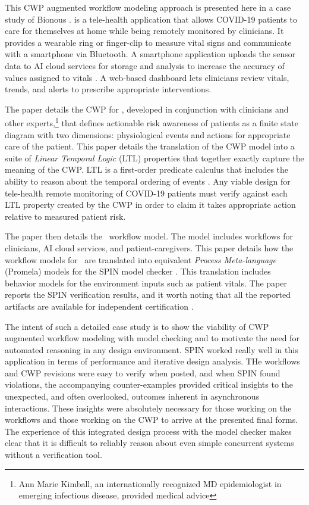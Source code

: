 This CWP augmented workflow modeling approach is presented here in a case study of Bionous \phware. \phware is a tele-health application that allows COVID-19 patients to care for themselves at home while being remotely monitored by clinicians. It provides a wearable ring or finger-clip to measure vital signs and communicate with a smartphone via Bluetooth. A smartphone application uploads the sensor data to AI cloud services for storage and analysis to increase the accuracy of values assigned to vitals \cite{Altschul2004PredictiveMI,10.2307/2984877,10.5555/1643031.1643047}. A web-based dashboard lets clinicians review vitals, trends, and alerts to prescribe appropriate interventions. 

The paper details the CWP for \phware, developed in conjunction with clinicians and other experts,\footnote{Ann Marie Kimball, an internationally recognized MD epidemiologist in emerging infectious disease, provided medical advice} that defines actionable risk awareness of patients as a finite state diagram with two dimensions: physiological events and actions for appropriate care of the patient. This paper details the translation of the CWP model into a suite of \emph{Linear Temporal Logic} (LTL) properties that together exactly capture the meaning of the CWP. LTL is a first-order predicate calculus that includes the ability to reason about the temporal ordering of events \cite{10.5555/975331}. Any viable design for tele-health remote monitoring of COVID-19 patients must verify against each LTL property created by the CWP in order to claim it takes appropriate action relative to measured patient risk.

The paper then details the \phware\ workflow model. The model includes workflows for clinicians, AI cloud services, and patient-caregivers. This paper details how the workflow models for \phware\ are translated into equivalent \emph{Process Meta-language} (Promela) models for the SPIN model checker \cite{spin}. This translation includes behavior models for the environment inputs such as patient vitals. The paper reports the SPIN verification results, and it worth noting that all the reported artifacts are available for independent certification \cite{repo}.

The intent of such a detailed case study is to show the viability of CWP augmented workflow modeling with model checking and to motivate the need for automated reasoning in any design environment. SPIN worked really well in this application in terms of performance and iterative design analysis. THe workflows and CWP revisions were easy to verify when posted, and when SPIN found violations, the accompanying counter-examples provided critical insights to the unexpected, and often overlooked, outcomes inherent in asynchronous interactions. These insights were absolutely necessary for those working on the workflows and those working on the CWP to arrive at the presented final forms. The experience of this integrated design process with the model checker makes clear that it is difficult to reliably reason about even simple concurrent systems without a verification tool.